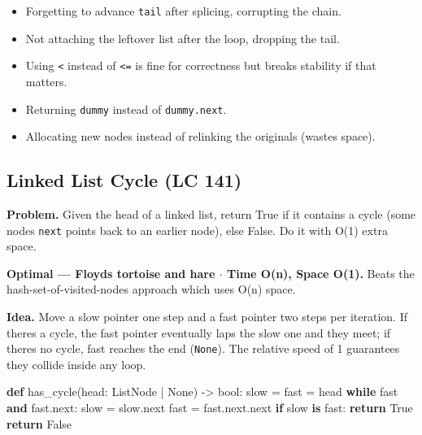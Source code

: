 \documentclass[11pt]{article}
\providecommand{\tightlist}{\setlength{\itemsep}{1pt}\setlength{\parskip}{0pt}}
\newenvironment{Shaded}{\begin{snugshade}}{\end{snugshade}}
\newcommand{\BuiltInTok}[1]{\textcolor[rgb]{0.50,0.55,0.55}{#1}}
\newcommand{\ControlFlowTok}[1]{\textcolor[rgb]{0.99,0.74,0.29}{\textbf{#1}}}
\newcommand{\KeywordTok}[1]{\textcolor[rgb]{0.81,0.81,0.76}{\textbf{#1}}}
\newcommand{\NormalTok}[1]{\textcolor[rgb]{0.81,0.81,0.76}{#1}}
\newcommand{\OperatorTok}[1]{\textcolor[rgb]{0.81,0.81,0.76}{#1}}
\newcommand{\VariableTok}[1]{\textcolor[rgb]{0.15,0.68,0.68}{#1}}
\begin{document}
\begin{itemize}
\tightlist
\item
  Forgetting to advance \texttt{tail} after splicing, corrupting the chain.
\item
  Not attaching the leftover list after the loop, dropping the tail.
\item
  Using \texttt{\textless{}} instead of \texttt{\textless{}=} is fine for correctness but breaks stability if that matters.
\item
  Returning \texttt{dummy} instead of \texttt{dummy.next}.
\item
  Allocating new nodes instead of relinking the originals (wastes space).
\end{itemize}

\subsection{Linked List Cycle (LC 141)}\label{linked-list-cycle-lc-141}

\textbf{Problem.} Given the head of a linked list, return True if it contains a cycle (some node\textquotesingle s \texttt{next} points back to an earlier node), else False. Do it with O(1) extra space.

\textbf{Optimal --- Floyd\textquotesingle s tortoise and hare \(\cdot\) Time O(n), Space O(1).} Beats the hash-set-of-visited-nodes approach which uses O(n) space.

\textbf{Idea.} Move a slow pointer one step and a fast pointer two steps per iteration. If there\textquotesingle s a cycle, the fast pointer eventually laps the slow one and they meet; if there\textquotesingle s no cycle, fast reaches the end (\texttt{None}). The relative speed of 1 guarantees they collide inside any loop.


\begin{Shaded}
\begin{Highlighting}[]
\KeywordTok{def}\NormalTok{ has\_cycle(head: ListNode }\OperatorTok{|} \VariableTok{None}\NormalTok{) }\OperatorTok{{-}\textgreater{}} \BuiltInTok{bool}\NormalTok{:}
\NormalTok{    slow }\OperatorTok{=}\NormalTok{ fast }\OperatorTok{=}\NormalTok{ head}
    \ControlFlowTok{while}\NormalTok{ fast }\KeywordTok{and}\NormalTok{ fast.}\BuiltInTok{next}\NormalTok{:}
\NormalTok{        slow }\OperatorTok{=}\NormalTok{ slow.}\BuiltInTok{next}
\NormalTok{        fast }\OperatorTok{=}\NormalTok{ fast.}\BuiltInTok{next}\NormalTok{.}\BuiltInTok{next}
        \ControlFlowTok{if}\NormalTok{ slow }\KeywordTok{is}\NormalTok{ fast:}
            \ControlFlowTok{return} \VariableTok{True}
    \ControlFlowTok{return} \VariableTok{False}
\end{Highlighting}
\end{Shaded}
\end{document}
